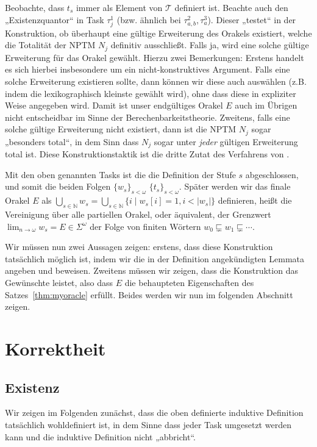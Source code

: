 Beobachte, dass $t_s$ immer als Element von $\mathcal T$ definiert ist.
Beachte auch den „Existenzquantor“ in Task $\tau^1_j$ (bzw. ähnlich bei $\tau^2_{a,b}, \tau^3_a$). Dieser „testet“ in der Konstruktion, ob überhaupt eine gültige Erweiterung des Orakels existiert, welche die Totalität der NPTM $N_j$ definitiv ausschließt. Falls ja, wird eine solche gültige Erweiterung für das Orakel gewählt.
Hierzu zwei Bemerkungen: Erstens handelt es sich hierbei insbesondere um ein nicht-konstruktives Argument. Falls eine solche Erweiterung existieren sollte, dann können wir diese auch auswählen (z.B. indem die lexikographisch kleinste gewählt wird), ohne dass diese in expliziter Weise angegeben wird.
Damit ist unser endgültiges Orakel $E$ auch im Übrigen nicht entscheidbar im Sinne der Berechenbarkeitstheorie.
Zweitens, falls eine solche gültige Erweiterung nicht existiert, dann ist die NPTM $N_j$ sogar „besonders total“, in dem Sinn dass $N_j$ sogar unter \emph{jeder} gültigen Erweiterung total ist. 
Diese Konstruktionstaktik ist die dritte Zutat des Verfahrens von \citeauthor{dose_np-completeness_2019}.

Mit den oben genannten Tasks ist die die Definition der Stufe $s$ abgeschlossen, und somit die beiden Folgen $\{w_s\}_{s<\omega}$ $\{t_s\}_{s<\omega}$.
Später werden wir das finale Orakel $E$ als $\bigcup_{s\in\mathbb N} w_s = \bigcup_{s\in\mathbb N} \{ i \mid w_s[i]=1, i<|w_s|\} $ definieren, heißt die Vereinigung über alle partiellen Orakel, oder äquivalent, der Grenzwert $\lim_{n\to\omega} w_s = E\in\Sigma^\omega$ der Folge von finiten Wörtern $w_0\sqsubsetneq  w_1\sqsubsetneq \cdots$.

Wir müssen nun zwei Aussagen zeigen: erstens, dass diese Konstruktion tatsächlich möglich ist, indem wir die in der Definition angekündigten Lemmata angeben und beweisen.
Zweitens müssen wir zeigen, dass die Konstruktion das Gewünschte leistet, also dass $E$ die behaupteten Eigenschaften des Satzes~\ref{thm:myoracle} erfüllt.
Beides werden wir nun im folgenden Abschnitt zeigen.

\section{Korrektheit}\label{sec:oracle-correctness}

\subsection*{Existenz}

Wir zeigen im Folgenden zunächst, dass die oben definierte induktive Definition tatsächlich wohldefiniert ist, in dem Sinne dass jeder Task umgesetzt werden kann und die induktive Definition nicht „abbricht“.

